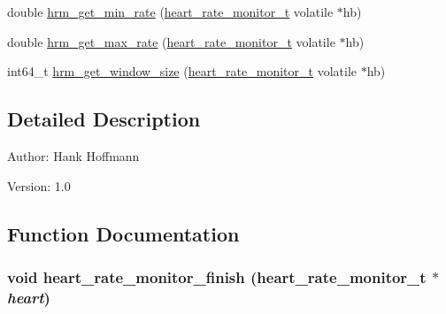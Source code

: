 \begin{CompactItemize}
\item 
double \hyperlink{heart__rate__monitor-shared_8c_d0ea463faa51e1bf20b3f5efbc4c91c3}{hrm\_\-get\_\-min\_\-rate} (\hyperlink{structheart__rate__monitor__t}{heart\_\-rate\_\-monitor\_\-t} volatile $\ast$hb)
\item 
double \hyperlink{heart__rate__monitor-shared_8c_f7f779cd6a79780479064da8b6eb05e7}{hrm\_\-get\_\-max\_\-rate} (\hyperlink{structheart__rate__monitor__t}{heart\_\-rate\_\-monitor\_\-t} volatile $\ast$hb)
\item 
int64\_\-t \hyperlink{heart__rate__monitor-shared_8c_1249c1ba65c775d2701de15b4415fded}{hrm\_\-get\_\-window\_\-size} (\hyperlink{structheart__rate__monitor__t}{heart\_\-rate\_\-monitor\_\-t} volatile $\ast$hb)
\end{CompactItemize}


\subsection{Detailed Description}
\begin{Desc}
\item[Author:]Hank Hoffmann \end{Desc}
\begin{Desc}
\item[Version:]1.0 \end{Desc}


\subsection{Function Documentation}
\hypertarget{heart__rate__monitor-shared_8c_070d042cdc3717897098cc6ac9682427}{
\subsubsection[heart\_\-rate\_\-monitor\_\-finish]{\setlength{\rightskip}{0pt plus 5cm}void heart\_\-rate\_\-monitor\_\-finish ({\bf heart\_\-rate\_\-monitor\_\-t} $\ast$ {\em heart})}}
\label{heart__rate__monitor-shared_8c_070d042cdc3717897098cc6ac9682427}


